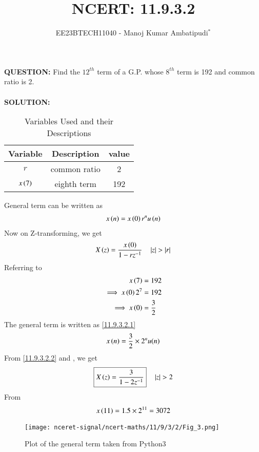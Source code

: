 \documentclass[journal,12pt,twocolumn]{IEEEtran}
\theoremstyle{remark}
\begin{document}

\vspace{3cm}
\title{NCERT: 11.9.3.2}
\author{EE23BTECH11040 - Manoj Kumar Ambatipudi$^{*}$%
}
\maketitle
\newpage
\bigskip
\renewcommand{\thefigure}{\theenumi}
\renewcommand{\thetable}{\theenumi}
\textbf{QUESTION:}
Find the $12^{th}$ term of a G.P. whose $8^{th}$ term is 192 and common ratio is 2.\\\\
\textbf{SOLUTION:}
\fi
\begin{table}[h!!]
\renewcommand\thetable{1}
    \centering
    \begin{tabular}{|c|c|c|}
    \hline
        Variable&             Description&value\\\hline
             $r$&            common ratio&2    \\\hline
     $x\left(7\right)$&              eighth term&192  \\\hline
    \end{tabular}
    \caption{Variables Used and their Descriptions}
    \label{tab 11.9.3.2.1}
\end{table}


General term can be written as 
\begin{align}
    x\left(n\right)=x\left(0\right)r^{n}u\left(n\right)\label{11.9.3.2.1}
\end{align}
Now on Z-transforming, we get
\begin{align}
    X\left(z\right)=\frac{x\left(0\right)}{1-rz^{-1}}\label{11.9.3.2.2} \quad   \left\vert z\right\vert>\left\vert r\right\vert
\end{align}
Referring to 
\begin{align}
         x\left(7\right)&=192\\
\implies x\left(0\right)2^{7}&=192\\
\implies x\left(0\right)&=\frac{3}{2}
\end{align}
The general term is written as \eqref{11.9.3.2.1}
\begin{align}
    x\left(n\right)=\frac{3}{2}\times2^{n}u(n)
\end{align}
From \eqref{11.9.3.2.2} and , we get
\begin{align}
   \boxed{X\left(z\right)=\frac{3}{1-2z^{-1}}}\quad   \left\vert z\right\vert>2
\end{align}
From  
\begin{align}
x\left(11\right) = 1.5\times2^{11} = 3072
\end{align}
\begin{figure}[h]
\renewcommand\thefigure{1} 
    \centering
    \texttt{[image: nceret-signal/ncert-maths/11/9/3/2/Fig\_3.png]}
    \caption{Plot of the general term taken from Python3}
    \label{fig:1}
\end{figure}
\end{document}
